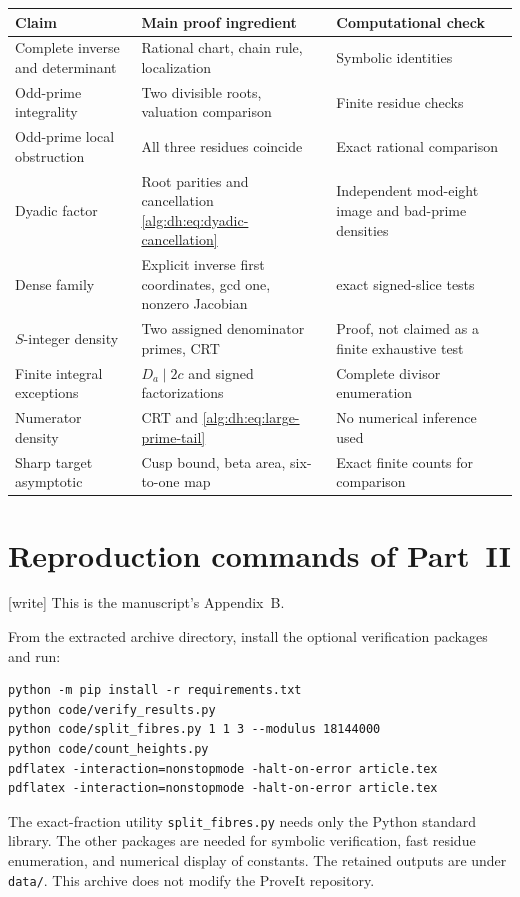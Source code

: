 \documentclass[11pt]{article}
\numberwithin{equation}{section}
\theoremstyle{plain}
\theoremstyle{plain}
\theoremstyle{plain}
\theoremstyle{definition}
\theoremstyle{definition}
\theoremstyle{definition}
\theoremstyle{remark}
\newcommand{\wtag}{\textup{[write]}}%
\newcommand{\rpath}[1]{\nolinkurl{#1}}
\begin{document}
\begin{longtable}{>{\raggedright\arraybackslash}p{}>{\raggedright\arraybackslash}p{}>{\raggedright\arraybackslash}p{}}
\toprule
Claim & Main proof ingredient & Computational check\\
\midrule
\endhead
Complete inverse and determinant & Rational chart, chain rule, localization & Symbolic identities\\
Odd-prime integrality & Two divisible roots, valuation comparison & Finite residue checks\\
Odd-prime local obstruction & All three residues coincide & Exact rational comparison\\
Dyadic factor & Root parities and cancellation \eqref{alg:dh:eq:dyadic-cancellation} & Independent mod-eight image and bad-prime densities\\
Dense family & Explicit inverse first coordinates, gcd one, nonzero Jacobian & 108 exact signed-slice tests\\
$S$-integer density & Two assigned denominator primes, CRT & Proof, not claimed as a finite exhaustive test\\
Finite integral exceptions & $D_a\mid2c$ and signed factorizations & Complete divisor enumeration\\
Numerator density & CRT and \eqref{alg:dh:eq:large-prime-tail} & No numerical inference used\\
Sharp target asymptotic & Cusp bound, beta area, six-to-one map & Exact finite counts for comparison\\
\bottomrule
\end{longtable}

\section{Reproduction commands of Part~II}\label{alg:dh:sec:repro}
\wtag{} This is the manuscript's Appendix~B.

From the extracted archive directory, install the optional verification
packages and run:
\begin{lstlisting}
python -m pip install -r requirements.txt
python code/verify_results.py
python code/split_fibres.py 1 1 3 --modulus 18144000
python code/count_heights.py
pdflatex -interaction=nonstopmode -halt-on-error article.tex
pdflatex -interaction=nonstopmode -halt-on-error article.tex
\end{lstlisting}
The exact-fraction utility \rpath{split_fibres.py} needs only the Python
standard library. The other packages are needed for symbolic verification,
fast residue enumeration, and numerical display of constants.
The retained outputs are under \rpath{data/}. This archive does not
modify the ProveIt repository.
\end{document}
